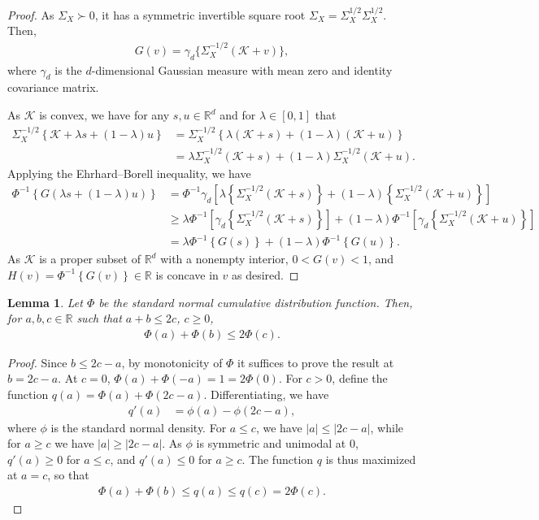 \documentclass[11pt]{article}
\newcommand{\1}{\mathbbm{1}}
\theoremstyle{plain}
\newtheorem{lemma}[theorem]{Lemma}
\theoremstyle{definition}
\begin{document}
\begin{proof}
As $\Sigma_X \succ 0$, it has a symmetric invertible square root $\Sigma_X = \Sigma_X^{1/2}\Sigma_X^{1/2}$. Then, 
\begin{align*} G(v) = \gamma_d\{\Sigma_X^{-1/2}\left(\mathcal{K} + v\right)\},\end{align*} where $\gamma_d$ is the $d$-dimensional Gaussian measure with mean zero and identity covariance matrix. 

As $\mathcal{K}$ is convex, we have for any $s, u \in \mathbb{R}^d$ and for $\lambda \in [0,1]$ that \begin{align*} \Sigma_X^{-1/2}\left\{\mathcal{K} + \lambda s + (1-\lambda)u\right\} &= \Sigma_X^{-1/2}\left\{\lambda(\mathcal{K} + s) + (1-\lambda)(\mathcal{K} + u)\right\}\\ &= \lambda \Sigma_X^{-1/2}(\mathcal{K}+s) + (1-\lambda)\Sigma_X^{-1/2}(\mathcal{K}+u).\end{align*} Applying the Ehrhard--Borell inequality, we have
\begin{align*}
\Phi^{-1}\left\{G(\lambda s + (1-\lambda)u)\right\} &= \Phi^{-1}\gamma_d\left[\lambda\left\{\Sigma_X^{-1/2}(\mathcal{K} + s)\right\} + (1-\lambda)\left\{\Sigma_X^{-1/2}(\mathcal{K} + u)\right\}\right]\\
& \geq \lambda\Phi^{-1}\left[\gamma_d\left\{\Sigma_X^{-1/2}(\mathcal{K} + s)\right\}\right] + (1-\lambda)\Phi^{-1}\left[\gamma_d\left\{\Sigma_X^{-1/2}(\mathcal{K} + u)\right\}\right]\\
&= \lambda \Phi^{-1}\left\{G(s)\right\} + (1-\lambda)\Phi^{-1}\left\{G(u)\right\}.
\end{align*}
As $\mathcal{K}$ is a proper subset of $\mathbb{R}^d$ with a nonempty interior, $0 < G(v)<1$, and $H(v)=\Phi^{-1}\left\{G(v)\right\} \in \mathbb{R}$ is concave in $v$ as desired.
\end{proof}

\begin{lemma}\label{lem:comparePhi} Let $\Phi$ be the standard normal cumulative distribution function. Then, for $a,b,c\in \mathbb{R}$ such that $a+b \leq 2c$, $c\geq 0$,
\begin{align*}
\Phi(a) + \Phi(b)\leq 2\Phi(c).
\end{align*}
\end{lemma}
\begin{proof} Since $b \leq 2c-a$, by monotonicity of $\Phi$ it suffices to prove the result at $b=2c-a$. At $c=0$, $\Phi(a)+\Phi(-a) = 1 = 2\Phi(0)$. For $c > 0$, define the function $q(a) = \Phi(a) + \Phi(2c-a)$. Differentiating, we have 
\begin{align*}
q'(a) &= \phi(a)-\phi(2c-a),
\end{align*}where $\phi$ is the standard normal density. For $a \leq c$, we have $|a| \leq |2c-a|$, while for $a \geq c$ we have $|a|\geq |2c-a|$. As $\phi$ is symmetric and unimodal at 0, $q'(a) \geq 0$ for $a \leq c$, and $q'(a) \leq 0$ for $a \geq c$. The function $q$ is thus maximized at $a=c$, so that \begin{align*} \Phi(a)+\Phi(b)\leq q(a)\leq q(c) = 2\Phi(c).\end{align*}\end{proof}
\end{document}

